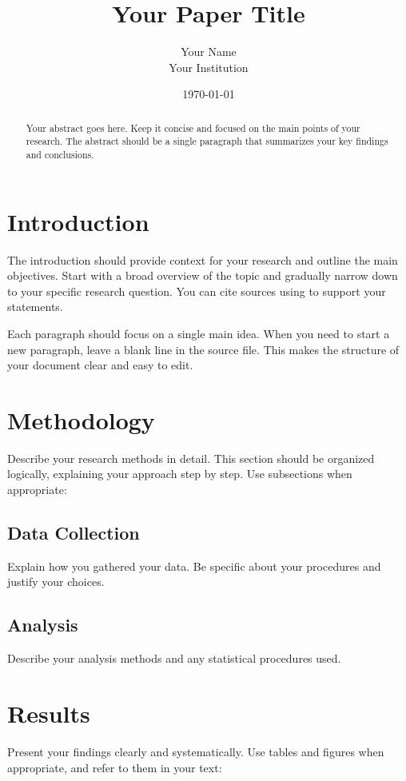 \documentclass[12pt]{article}
\title{\vspace{-1.5in}Your Paper Title}
\author{Your Name\\Your Institution}
\date{\today}
\begin{document}
\maketitle
\thispagestyle{empty}  %

\begin{abstract}
  Your abstract goes here. Keep it concise and focused on the main points of your 
  research. The abstract should be a single paragraph that summarizes your key 
  findings and conclusions.
\end{abstract}

\section{Introduction}
  The introduction should provide context for your research and outline the main 
  objectives. Start with a broad overview of the topic and gradually narrow down 
  to your specific research question. You can cite sources using 
  \cite{example2024} to support your statements.

  Each paragraph should focus on a single main idea. When you need to start a new 
  paragraph, leave a blank line in the source file. This makes the structure of 
  your document clear and easy to edit.

\section{Methodology}
  Describe your research methods in detail. This section should be organized 
  logically, explaining your approach step by step. Use subsections when 
  appropriate:

  \subsection{Data Collection}
    Explain how you gathered your data. Be specific about your procedures and 
    justify your choices.

  \subsection{Analysis}
    Describe your analysis methods and any statistical procedures used.

\section{Results}
  Present your findings clearly and systematically. Use tables and figures when 
  appropriate, and refer to them in your text:
\end{document}
